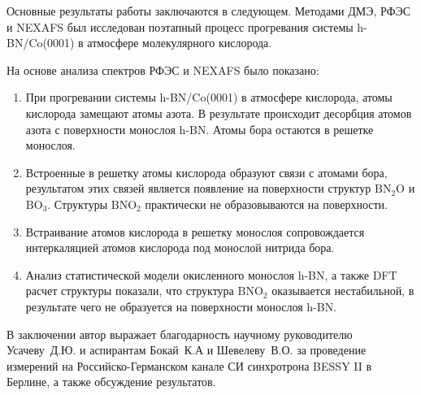 Основные результаты работы заключаются в следующем. Методами ДМЭ, РФЭС и NEXAFS был исследован поэтапный процесс
прогревания системы h-BN/Co(0001) в атмосфере молекулярного кислорода.


На основе анализа спектров РФЭС и NEXAFS было показано:

  \begin{enumerate}
    \vspace{15pt}
    \item При прогревании системы h-BN/Co(0001) в атмосфере кислорода, атомы кислорода замещают атомы азота. В результате происходит десорбция атомов азота с  поверхности монослоя h-BN. Атомы бора остаются в решетке монослоя.
    \item Встроенные в решетку атомы кислорода образуют связи с атомами бора, результатом этих связей
    является появление на поверхности структур $\mathrm{BN_2O}$ и $\mathrm{BO_3}$. Структуры $\mathrm{BNO_2}$ практически не образовываются на поверхности.
    \item Встраивание атомов кислорода в решетку монослоя сопровождается интеркаляцией атомов кислорода
    под монослой нитрида бора.
    \item Анализ статистической модели окисленного монослоя h-BN, а также DFT 
    расчет структуры показали, что структура $\mathrm{BNO_2}$ оказывается нестабильной, в 
    результате чего не образуется на поверхности монослоя h-BN.
  \end{enumerate}

  \vspace{15pt}

В заключении автор выражает благодарность научному руководителю Усачеву~Д.\:Ю. и аспирантам Бокай~К.\:А и
Шевелеву~В.\:О. за проведение измерений на Российско-Германском канале СИ синхротрона BESSY II в Берлине, а также обсуждение результатов.
